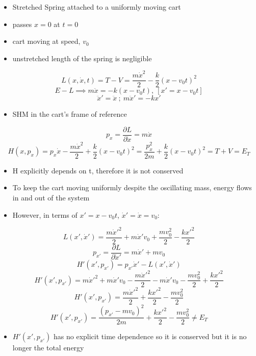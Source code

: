 \documentclass[a4paper,11pt,normalem]{article}
\begin{document}
\begin{example}[3]
\begin{itemize}
\item
  Stretched Spring attached to a uniformly moving cart
\item
  passes \(x = 0\) at \(t = 0\)
\item
  cart moving at speed, \(v_0\)
\item
  unstretched length of the spring is negligible
\end{itemize}

\[
    L(x, \dot{x}, t) = T - V = \frac{m\dot{x}^2}{2} - \frac{k}{2}(x - v_0t)^2 \]
\[
    E-L \implies m\ddot{x} = -k(x - v_0t),~[x' = x - v_0t] \] \[
    \ddot{x}' = \ddot{x} ~;~ m\ddot{x}' = -kx'
\]

\begin{itemize}
\item
  SHM in the cart's frame of reference
\end{itemize}

\[
    p_x = \frac{\partial L}{\partial \dot{x}} = m\dot{x} \] \[
    H(x, p_x) = p_x\dot{x} - \frac{m\dot{x}^2}{2} + \frac{k}{2}(x - v_0t)^2 = \frac{p_{x}^2}{2m} + \frac{k}{2}(x - v_0t)^2 = T + V = E_T
\]

\begin{itemize}
\item
  H explicitly depends on t, therefore it is not conserved
\item
  To keep the cart moving uniformly despite the oscillating mass, energy
  flows in and out of the system
\item
  However, in terms of \(x' = x - v_0t\), \(\dot{x}' = \dot{x} = v_0\):
\end{itemize}

\[
    L(x', \dot{x}') = \frac{m\dot{x}'^2}{2} + m\dot{x}'v_0 + \frac{mv_{0}^2}{2} - \frac{kx'^2}{2} \]
\[
    p_{x'} = \frac{\partial L}{\partial \dot{x}'} = m\dot{x}' + mv_0 \]
\[
    H'(x', p_{x'}) = p_{x'}\dot{x}' - L(x', \dot{x}') \] \[
    H'(x', p_{x'}) = m\dot{x}'^2 + m\dot{x}'v_0 - \frac{m\dot{x}'^2}{2} - m\dot{x}'v_0 - \frac{mv_{0}^2}{2} + \frac{kx'^2}{2} \]
\[
    H'(x', p_{x'}) = \frac{m\dot{x}'^2}{2} + \frac{kx'^2}{2} - \frac{mv_{0}^2}{2} \]
\[
    H'(x', p_{x'}) = \frac{(p_{x'} - mv_0)^2}{2m} + \frac{kx'^2}{2} - \frac{mv_{0}^2}{2} \neq E_T
\]

\begin{itemize}
\item
  \(H'(x', p_{x'})\) has no explicit time dependence so it is conserved
  but it is no longer the total energy
\end{itemize}
\end{example}
\end{document}
